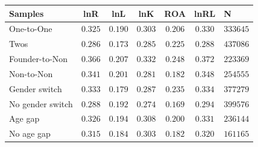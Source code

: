 \begin{tabular}{l*{5}{c}}
\hline\hline
Samples & lnR & lnL & lnK & ROA & lnRL & N \\
\hline
One-to-One & $0.325$ & $0.190$ & $0.303$ & $0.206$ & $0.330$ & $333645$ \\
Twos & $0.286$ & $0.173$ & $0.285$ & $0.225$ & $0.288$ & $437086$ \\
Founder-to-Non & $0.366$ & $0.207$ & $0.332$ & $0.248$ & $0.372$ & $223369$ \\
Non-to-Non & $0.341$ & $0.201$ & $0.281$ & $0.182$ & $0.348$ & $254555$ \\
Gender switch & $0.333$ & $0.179$ & $0.287$ & $0.235$ & $0.334$ & $377279$ \\
No gender switch & $0.288$ & $0.192$ & $0.274$ & $0.169$ & $0.294$ & $399576$ \\
Age gap & $0.326$ & $0.194$ & $0.308$ & $0.200$ & $0.331$ & $236144$ \\
No age gap & $0.315$ & $0.184$ & $0.303$ & $0.182$ & $0.320$ & $161165$ \\
\hline\hline
\end{tabular}
